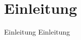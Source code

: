 
{
    \section{Einleitung}
}

\begin{frame}{Einleitung}
    Einleitung~\cite{mollerIndustrialDataEcosystems2024}
\end{frame}
